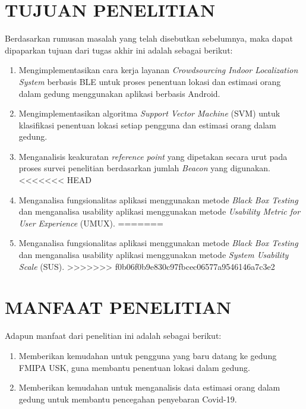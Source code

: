 \section{\uppercase{TUJUAN PENELITIAN}}
Berdasarkan rumusan masalah yang telah disebutkan sebelumnya, maka dapat dipaparkan tujuan dari tugas akhir ini adalah sebagai berikut:
\begin{enumerate}
	\item Mengimplementasikan cara kerja layanan \textit{Crowdsourcing Indoor Localization System} berbasis BLE untuk proses penentuan lokasi dan estimasi orang dalam gedung menggunakan aplikasi berbasis Android.
	\item Mengimplementasikan algoritma \textit{\textit{Support Vector Machine}} (SVM) untuk klasifikasi penentuan lokasi setiap pengguna dan estimasi orang dalam gedung.
	\item Menganalisis keakuratan \textit{reference point} yang dipetakan secara urut pada proses survei penelitian berdasarkan jumlah \textit{Beacon} yang digunakan.
<<<<<<< HEAD
	\item Menganalisa fungsionalitas aplikasi menggunakan metode \textit{Black Box Testing} dan menganalisa usability aplikasi menggunakan metode \textit{Usability Metric for User Experience} (UMUX).
=======
	\item Menganalisa fungsionalitas aplikasi menggunakan metode \textit{Black Box Testing} dan menganalisa usability aplikasi menggunakan metode \textit{System Usability Scale} (SUS).
>>>>>>> f0b06f0b9e830c97fbcec06577a9546146a7c3e2
\end{enumerate}


\section{\uppercase{manfaat penelitian}}
Adapun manfaat dari penelitian ini adalah sebagai berikut:
\begin{enumerate}
	\item Memberikan kemudahan untuk pengguna yang baru datang ke gedung FMIPA USK, guna membantu penentuan lokasi dalam gedung.
	\item Memberikan kemudahan untuk menganalisis data estimasi orang dalam gedung untuk membantu pencegahan penyebaran Covid-19.

\end{enumerate}


\begin{comment}

\end{comment}